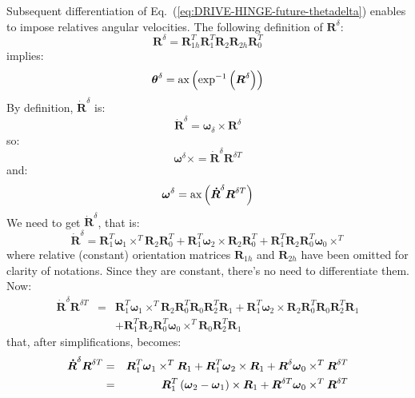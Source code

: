 \documentclass[10pt,dvips,fleqn]{report}
\newcommand{\T}[1]{\boldsymbol{#1}}
\begin{document}
\noindent
Subsequent differentiation of Eq.~(\ref{eq:DRIVE-HINGE-future-thetadelta}) enables to impose relatives angular velocities. The following definition of $\T{R}^{\delta}$:
\begin{equation*}
	\T{R}^{\delta} = \T{R}_{1h}^T \T{R}_1^T \T{R}_2 \T{R}_{2h} \T{R}_0^T
\end{equation*}
implies:
\begin{equation*}
	\T{\theta}^{\delta} = \llk{ax}\plbr{\exp^{-1}\plbr{
		\T{R}^{\delta}}}
\end{equation*}
By definition, $\T{\dot{R}}^{\delta}$ is:
\begin{equation*}
\T{\dot{R}}^{\delta} = \T{\omega}_{\delta}\times\T{R}^{\delta}
\end{equation*}
so:
\begin{equation*}
\T{\omega}^{\delta}\times = \T{\dot{R}}^{\delta}\T{R}^{\delta T}
\end{equation*}
and:
\begin{equation}
\T{\omega}^{\delta} = \llk{ax}\plbr{\T{\dot{R}}^{\delta}\T{R}^{\delta T}}
\label{eq:DRIVE-HINGE-future-omegadelta}
\end{equation}
We need to get $\T{\dot{R}}^{\delta}$, that is:
\begin{equation*}
\T{\dot{R}}^{\delta} = 	\T{R}_1^T \T{\omega}_1\times^T \T{R}_2 \T{R}_0^T + 
			\T{R}_1^T \T{\omega}_2\times \T{R}_2 \T{R}_0^T +
			\T{R}_1^T \T{R}_2 \T{R}_0^T \T{\omega}_0\times^T
\end{equation*}
where relative (constant) orientation matrices $\T{R}_{1h}$ and $\T{R}_{2h}$ have been omitted for clarity of notations. Since they are constant, there's no need to differentiate them. Now:
\begin{eqnarray*}
\T{\dot{R}}^{\delta}\T{R}^{\delta T} &=& 	
	\T{R}_1^T \T{\omega}_1\times^T \T{R}_2 \T{R}_0^T \T{R}_0\T{R}_2^T \T{R}_1 + 
	\T{R}_1^T \T{\omega}_2\times \T{R}_2 \T{R}_0^T \T{R}_0\T{R}_2^T \T{R}_1\\
	&& + \T{R}_1^T \T{R}_2 \T{R}_0^T \T{\omega}_0\times^T \T{R}_0\T{R}_2^T \T{R}_1
\end{eqnarray*}
that, after simplifications, becomes:
\begin{eqnarray*}
\T{\dot{R}}^{\delta}\T{R}^{\delta T}  	
		&=&	\T{R}_1^T \T{\omega}_1\times^T \T{R}_1 + 
			\T{R}_1^T \T{\omega}_2\times   \T{R}_1 +
			\T{R}^{\delta} \T{\omega}_0\times^T \T{R}^{\delta T}
		\\
		&=&	\T{R}_1^T \plbr{\T{\omega}_2-\T{\omega}_1}\times \T{R}_1 + 
			\T{R}^{\delta T} \T{\omega}_0\times^T \T{R}^{\delta T}
\end{eqnarray*}
\end{document}
